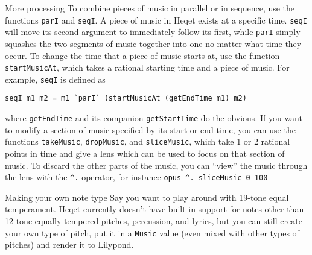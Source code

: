 \documentclass{article}
\begin{document}
\begin{section}{More processing}
To combine pieces of music in parallel or in sequence, use the functions \verb+parI+ and \verb+seqI+. A piece of music in Heqet exists at a specific time. \verb+seqI+ will move its second argument to immediately follow its first, while \verb+parI+ simply squashes the two segments of music together into one no matter what time they occur. To change the time that a piece of music starts at, use the function \verb+startMusicAt+, which takes a rational starting time and a piece of music. For example, \verb+seqI+ is defined as

\begin{verbatim}
seqI m1 m2 = m1 `parI` (startMusicAt (getEndTime m1) m2)
\end{verbatim}

where \verb+getEndTime+ and its companion \verb+getStartTime+ do the obvious. If you want to modify a section of music specified by its start or end time, you can use the functions \verb+takeMusic+, \verb+dropMusic+, and \verb+sliceMusic+, which take 1 or 2 rational points in time and give a lens which can be used to focus on that section of music. To discard the other parts of the music, you can ``view'' the music through the lens with the \verb+^.+ operator, for instance \verb+opus ^. sliceMusic 0 100+
\end{section}


\begin{section}{Making your own note type}
Say you want to play around with 19-tone equal temperament. Heqet currently doesn't have built-in support for notes other than 12-tone equally tempered pitches, percussion, and lyrics, but you can still create your own type of pitch, put it in a \verb+Music+ value (even mixed with other types of pitches) and render it to Lilypond.

\end{section}
\end{document}
